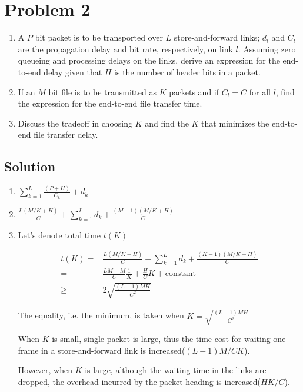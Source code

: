 
\section*{Problem 2}

\begin{enumerate}
    \item A $P$ bit packet is to be transported over $L$ store-and-forward links; $d_l$ and $C_l$ are the propagation
          delay and bit rate, respectively, on link $l$.
          Assuming zero queueing and processing delays on the links, derive an expression for the end-to-end delay given that $H$ is the number of header bits in a packet.
    \item If an $M$ bit file is to be transmitted as $K$ packets and if $C_l = C$ for all $l$, find the expression for the end-to-end file transfer time.
    \item Discuss the tradeoff in choosing $K$ and find the $K$ that minimizes the end-to-end file transfer delay.
\end{enumerate}

\subsection*{Solution}

\begin{enumerate}
    \item $ \sum_{k=1}^L \frac{(P+H)}{C_k} + d_k $
    \item $ \frac{L(M/K + H)}{C} + \sum_{k=1}^L d_k + \frac{(M-1)(M/K + H)}{C}$
    \item Let's denote total time $t(K)$

          \begin{align*}
              t(K) = & \frac{L(M/K + H)}{C} + \sum_{k=1}^L d_k + \frac{(K-1)(M/K + H)}{C} \\
              =      & \frac{LM - M}{C}\frac{1}{K} + \frac{H}{C}K + \text{constant}       \\
              \ge    & 2\sqrt{\frac{(L-1)MH}{C^2}}
          \end{align*}

          The equality, i.e. the minimum, is taken when $K = \sqrt{\frac{(L-1)MH}{C^2}}$

          When $K$ is small, single packet is large, thus the time cost for waiting one frame in a store-and-forward link is increased($(L-1)M/CK$).

          However, when $K$ is large, although the waiting time in the links are dropped, the overhead incurred by the packet heading is increased($HK/C$).
\end{enumerate}